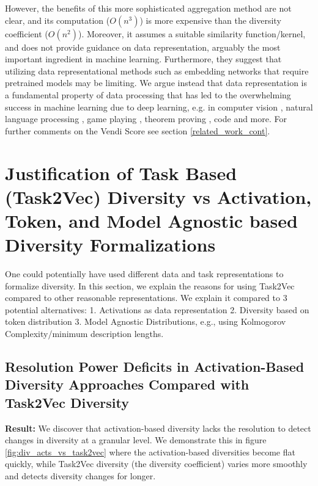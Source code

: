 However, the benefits of this more sophisticated aggregation method are not clear, and its computation ($O(n^3)$) is more expensive than the diversity coefficient ($O(n^2)$). 
Moreover, it assumes a suitable similarity function/kernel, and does not provide guidance on data representation, arguably the most important ingredient in machine learning. 
Furthermore, they suggest that utilizing data representational methods such as embedding networks that require pretrained models may be limiting.
We argue instead that data representation is a fundamental property of data processing that has led to the overwhelming success in machine learning due to deep learning, e.g. in computer vision \citep{alexnet, resnet}, natural language processing \citep{bert, gpt3, chowdhery2022palm, gpt4, google2023palm2}, game playing \citep{alphago, atari1, EfficientZero}, theorem proving \citep{skiptree, gptf, pact}, code \citep{codex} and more.
For further comments on the Vendi Score see section \ref{related_work_cont}.

\section{Justification of Task Based (Task2Vec) Diversity vs Activation, Token, and Model Agnostic based Diversity Formalizations}
One could potentially have used different data and task representations to formalize diversity.
In this section, we explain the reasons for using Task2Vec compared to other reasonable representations. 
We explain it compared to 3 potential alternatives: 
1. Activations as data representation
2. Diversity based on token distribution
3. Model Agnostic Distributions, e.g., using Kolmogorov Complexity/minimum description lengths.

\subsection{Resolution Power Deficits in Activation-Based Diversity Approaches Compared with Task2Vec Diversity}\label{subsection:div_acts_vs_task2vec}
\textbf{Result:} 
We discover that activation-based diversity lacks the resolution to detect changes in diversity at a granular level.
We demonstrate this in figure \ref{fig:div_acts_vs_task2vec} where the activation-based diversities become flat quickly, while Task2Vec diversity (the diversity coefficient) varies more smoothly and detects diversity changes for longer. 


